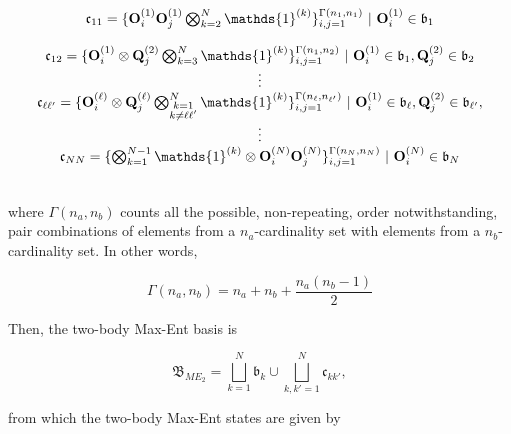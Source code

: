 \documentclass{homework}
\begin{document}
\begin{tcolorbox}[title = N\"aive two-body Max-Ent]
\begin{equation*}
\begin{array}{c}
             \mathfrak{c}_{11} = \{\mathbf{O}_i^{(1)} \mathbf{O}_j^{(1)} \bigotimes_{k=2}^{N} \mathds{1}^{(k)}\}_{\substack{i, j= 1}}^{\Gamma(n_1, n_1)} \blanky | \blanky {\bf O}_i^{(1)} \in \mathfrak{b}_{1}  \\
             \\
             \mathfrak{c}_{12} = \{\mathbf{O}_i^{(1)} \otimes \mathbf{Q}_j^{(2)} \bigotimes_{k=3}^{N} \mathds{1}^{(k)}\}_{\substack{i, j= 1}}^{\Gamma(n_1, n_2)} \blanky | \blanky {\bf O}_i^{(1)} \in \mathfrak{b}_{1}, {\bf Q}_j^{(2)} \in \mathfrak{b}_{2}\\
             \vdots \\
             \mathfrak{c}_{\ell \ell'} =  \{\mathbf{O}_i^{(\ell)} \otimes \mathbf{Q}_j^{(\ell)} \bigotimes_{\substack{k=1 \\
                                   k \neq \ell             \ell'}}^{N} 
            \mathds{1}^{(k)}\}_{\substack{i, j= 1}}^{\Gamma(n_\ell, n_{\ell'})} \blanky | \blanky {\bf O}_i^{(1)} \in \mathfrak{b}_{\ell}, {\bf Q}_j^{(2)} \in \mathfrak{b}_{\ell'},\\
            \vdots \\
            \mathfrak{c}_{NN} = \{\bigotimes_{k=1}^{N-1} \mathds{1}^{(k)} \otimes \mathbf{O}_i^{(N)} \mathbf{O}_j^{(N)}\}_{\substack{i, j= 1}}^{\Gamma(n_N, n_N)} \blanky | \blanky {\bf O}_i^{(N)} \in \mathfrak{b}_{N}  \\
        \end{array}
\end{equation*}

\blanky\\

where $\Gamma(n_a, n_b)$ counts all the possible, non-repeating, order notwithstanding, pair combinations of elements from a $n_a$-cardinality set with elements from a $n_b$-cardinality set. In other words, 

\begin{equation}
    \Gamma(n_a, n_b) = 
        n_a + n_b + \frac{n_a(n_b-1)}{2}
\end{equation} 

Then, the two-body Max-Ent basis is 

$$
    \mathfrak{B}_{ME_2} = \bigsqcup_{k=1}^{N} \mathfrak{b}_k \cup \bigsqcup_{k, k' = 1}^{N} \mathfrak{c}_{kk'},
$$

from which the two-body Max-Ent states are given by 


\end{tcolorbox}
\end{document}

